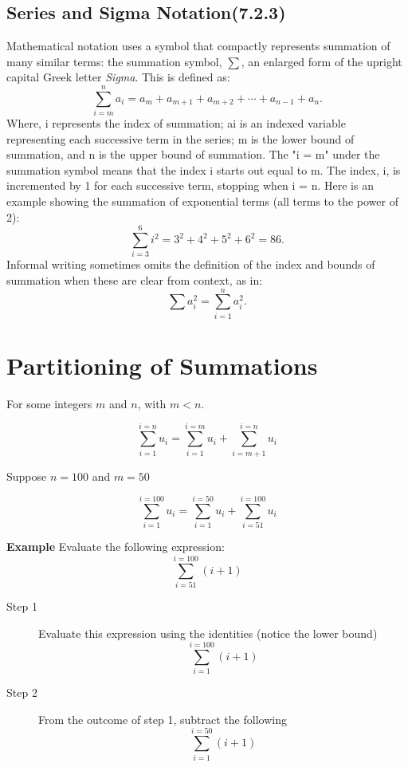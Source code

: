 

\subsection*{Series and Sigma Notation(7.2.3)}
Mathematical notation uses a symbol that compactly represents summation of many similar terms: the summation symbol, $\sum$, an enlarged form of the upright capital Greek letter \textit{Sigma}. This is defined as:
\[\sum_{i=m}^n a_i = a_m + a_{m+1} + a_{m+2} +\cdots+ a_{n-1} + a_n. \]
Where, i represents the index of summation; ai is an indexed variable representing each successive term in the series; m is the lower bound of summation, and n is the upper bound of summation. The "i = m" under the summation symbol means that the index i starts out equal to m. The index, i, is incremented by 1 for each successive term, stopping when i = n.
Here is an example showing the summation of exponential terms (all terms to the power of 2):
\[\sum_{i=3}^6 i^2 = 3^2+4^2+5^2+6^2 = 86.\]
Informal writing sometimes omits the definition of the index and bounds of summation when these are clear from context, as in:
\[\sum a_i^2 = \sum_{i=1}^n a_i^2.\]




\section{Partitioning of Summations}


For some integers $m$ and $n$, with $m<n$.

\[ \sum^{i=n}_{i=1} u_{i} = \sum^{i=m}_{i=1} u_{i} + \sum^{i=n}_{i=m+1} u_{i}\]

Suppose $n=100$ and $m=50$

\[ \sum^{i=100}_{i=1} u_{i} = \sum^{i=50}_{i=1} u_{i} + \sum^{i=100}_{i=51} u_{i}\]



\textbf{Example}
Evaluate the following expression:
\[ \sum^{i=100}_{i=51} (i+1) \]

\begin{description}
\item[Step 1] Evaluate this expression using the identities (notice the lower bound)
\[ \sum^{i=100}_{i=1} (i+1) \]
\item[Step 2] From the outcome of step 1, subtract the following
\[ \sum^{i=50}_{i=1} (i+1) \]
\end{description}



